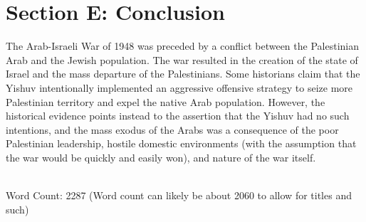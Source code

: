 \documentclass[12pt]{turabian-researchpaper}
\begin{document}

\section{Section E: Conclusion}
The Arab-Israeli War of 1948 was preceded by a conflict between the Palestinian Arab and the Jewish population.  The war resulted in the creation of the state of Israel and the mass departure of the Palestinians.  Some historians claim that the Yishuv intentionally implemented an aggressive offensive strategy to seize more Palestinian territory and expel the native Arab population.  However, the historical evidence points instead to the assertion that the Yishuv had no such intentions, and the mass exodus of the Arabs was a consequence of the poor Palestinian leadership, hostile domestic environments (with the assumption that the war would be quickly and easily won), and nature of the war itself.

~\\

Word Count: 2287
(Word count can likely be about 2060 to allow for titles and such)

\printbibliography[title=Section F: Bibliography]{}
\end{document}
